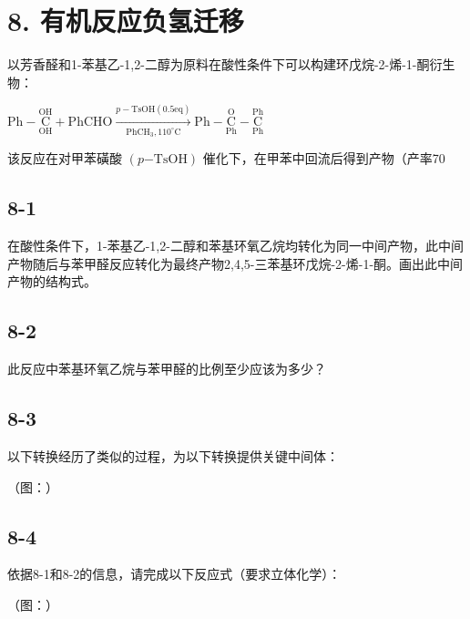 \section*{8. 有机反应负氢迁移}
以芳⾹醛和1-苯基⼄-1,2-⼆醇为原料在酸性条件下可以构建环戊烷-2-烯-1-酮衍⽣物：

$
\mathrm{Ph} - \underset {\mathrm{OH}} {\overset {\mathrm{OH}} {\mathrm{C}}} + \mathrm{PhCHO} \xrightarrow [ \mathrm{PhCH} _ {3} , 1 1 0 ^ {\circ} \mathrm{C} ]{p - \mathrm{TsOH(0.5eq)}} \mathrm{Ph} - \underset {\mathrm{Ph}} {\overset {\mathrm{O}} {\mathrm{C}}} - \underset {\mathrm{Ph}} {\overset {\mathrm{Ph}} {\mathrm{C}}}
$

该反应在对甲苯磺酸 $( p { \mathrm { - } } \mathrm { T s O H } )$ 催化下，在甲苯中回流后得到产物（产率70%

\subsection*{8-1}
在酸性条件下，1-苯基⼄-1,2-⼆醇和苯基环氧⼄烷均转化为同⼀中间产物，此中间产物随后与苯甲醛反应转化为最终产物2,4,5-三苯基环戊烷-2-烯-1-酮。画出此中间产物的结构式。

\subsection*{8-2}
此反应中苯基环氧⼄烷与苯甲醛的⽐例⾄少应该为多少？

\subsection*{8-3}
以下转换经历了类似的过程，为以下转换提供关键中间体：

（图：）

\subsection*{8-4}
依据8-1和8-2的信息，请完成以下反应式（要求⽴体化学）：

（图：）
